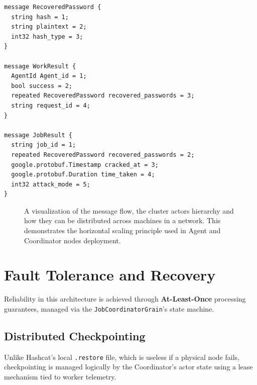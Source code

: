 \begin{enumerate}
\begin{verbatim}
message RecoveredPassword {
  string hash = 1;
  string plaintext = 2;
  int32 hash_type = 3;
}

message WorkResult {
  AgentId Agent_id = 1;
  bool success = 2;
  repeated RecoveredPassword recovered_passwords = 3;
  string request_id = 4;
}

message JobResult {
  string job_id = 1;
  repeated RecoveredPassword recovered_passwords = 2;
  google.protobuf.Timestamp cracked_at = 3;
  google.protobuf.Duration time_taken = 4;
  int32 attack_mode = 5;
}
\end{verbatim}
    
\end{enumerate}

\begin{figure}[H]
\centering

\caption{A visualization of the message flow, the cluster actors hierarchy and how they can be distributed across machines in a network. This demonstrates the horizontal scaling principle used in Agent and Coordinator nodes deployment.}
\end{figure}

\section{Fault Tolerance and Recovery}

Reliability in this architecture is achieved through \textbf{At-Least-Once} processing guarantees, managed via the \verb|JobCoordinatorGrain|'s state machine.

\subsection{Distributed Checkpointing}

Unlike Hashcat's local \verb|.restore| file, which is useless if a physical node fails, checkpointing is managed logically by the Coordinator's actor state using a lease mechanism tied to worker telemetry.


